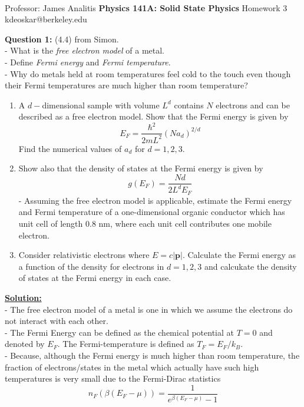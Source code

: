 \documentclass[11pt]{article}
\begin{document}
\thispagestyle{empty}
\bigskip \
\vspace{0.1cm}

\begin{center}
{\fontsize{22}{22} \selectfont Professor: James Analitis}
\vskip 16pt
{\fontsize{30}{30} \selectfont \bf \sffamily Physics 141A: Solid State Physics}
\vskip 24pt
{\fontsize{14}{14} \selectfont \rmfamily Homework 3} 
\vskip 6pt
{\fontsize{14}{14} \selectfont \ttfamily kdeoskar@berkeley.edu} 
\vskip 24pt
\end{center}





\begin{bluebox}
  \textbf{Question 1:} (4.4) from Simon. \\
  - What is the \textit{free electron model} of a metal.\\
  - Define \textit{Fermi energy} and \textit{Fermi temperature}.\\
  - Why do metals held at room temperatures feel cold to the touch even though their Fermi temperatures are much higher than room temperature?
  \begin{enumerate}[label=(\alph*)]
    \item A $d-$dimensional sample with volume $L^d$ contains $N$ electrons and can be described as a free electron model. Show that the Fermi energy is given by 
    $$ E_F = \frac{\hbar^2}{2mL^2} (Na_d)^{2/d}$$ Find the numerical values of $a_d$ for $d = 1,2,3$.

    \item Show also that the density of states at the Fermi energy is given by $$ g(E_F) = \frac{Nd}{2L^d E_F} $$ - Assuming the free electron model is applicable, estimate the Fermi energy and Fermi temperature of a one-dimensional organic conductor which has unit cell of length $0.8$ nm, where each unit cell contributes one mobile electron.
    
    \item Consider relativistic electrons where $E = c|\mathbf{p}|$. Calculate the Fermi energy as a function of the density for electrons in $d = 1,2,3$ and calcukate the density of states at the Fermi energy in each case.
  \end{enumerate}
\end{bluebox}

\vskip 0.5cm
\textbf{\underline{Solution:}}
\\
- The free electron model of a metal is one in which we assume the electrons do not interact with each other.\\
- The Fermi Energy can be defined as the chemical potential at $T = 0$ and denoted by $ E_F $. The Fermi-temperature is defined as $T_F = E_F / k_B$. \\
- Because, although the Fermi energy is much higher than room temperature, the fraction of electrons/states in the metal which actually have such high temperatures is very small due to the Fermi-Dirac statistics $$ n_{F}(\beta(E_F - \mu)) = \frac{1}{e^{\beta(E_F - \mu)} - 1} $$
\end{document}
